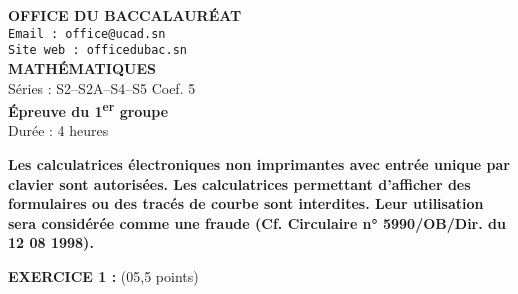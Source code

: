 \documentclass[11pt]{article}
\begin{document}
\begin{center}
    \textbf{\Large OFFICE DU BACCALAURÉAT} \\
    \texttt{Email : office@ucad.sn} \\
    \texttt{Site web : officedubac.sn} \\
    \vspace{0.3cm}
    \textbf{\LARGE MATHÉMATIQUES} \\
    \vspace{0.2cm}
    Séries : S2–S2A–S4–S5 \hfill Coef. 5 \\
    \textbf{Épreuve du 1\textsuperscript{er} groupe} \\
    Durée : 4 heures
\end{center}

\vspace{0.2cm}
\noindent
\textbf{Les calculatrices électroniques non imprimantes avec entrée unique par clavier sont autorisées. Les calculatrices permettant d’afficher des formulaires ou des tracés de courbe sont interdites. Leur utilisation sera considérée comme une fraude (Cf. Circulaire n° 5990/OB/Dir. du 12 08 1998).}

\vspace{0.5cm}
\noindent
\textbf{EXERCICE 1 :} \hfill (05,5 points)
\end{document}
